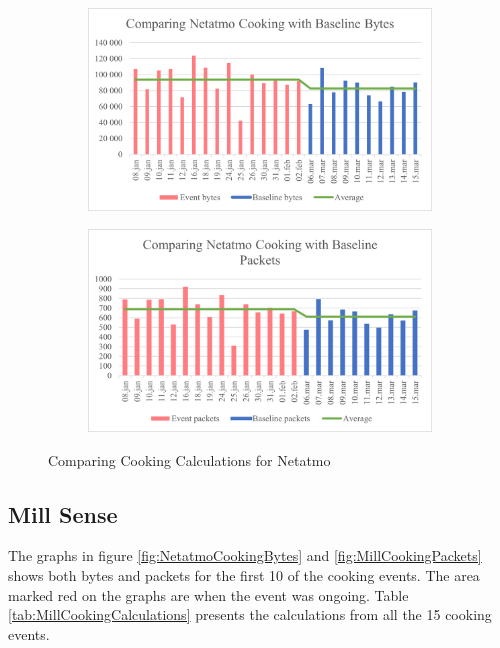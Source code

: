 \begin{figure}[H]
    \centering
    \begin{subfigure}{0.49\textwidth}
        \centering
        \includegraphics[width=1\hsize]{figures/Netatmo_Comparing_Cooking_Calculations_Bytes.png} 
    \end{subfigure}
    \begin{subfigure}{0.49\textwidth}
        \centering
        \includegraphics[width=1\hsize]{figures/Netatmo_Comparing_Cooking_Calculations_Packets.png} 
    \end{subfigure}
    \caption{Comparing Cooking Calculations for Netatmo}
    \label{fig:NetatmoComparingCookingCalculations}
\end{figure}

\subsection{Mill Sense}
The graphs in figure \ref{fig:NetatmoCookingBytes} and \ref{fig:MillCookingPackets} shows both bytes and packets for the first 10 of the cooking events. The area marked red on the graphs are when the event was ongoing. Table \ref{tab:MillCookingCalculations} presents the calculations from all the 15 cooking events. 

